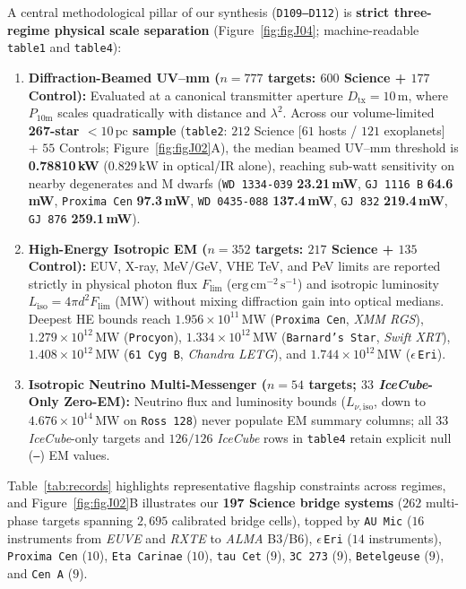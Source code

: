 \documentclass[twocolumn,10pt]{article}
\begin{document}
A central methodological pillar of our synthesis (\texttt{D109--D112}) is \textbf{strict three-regime physical scale separation} (Figure~\ref{fig:figJ04}; machine-readable \texttt{table1} and \texttt{table4}):
\begin{enumerate}
  \item \textbf{Diffraction-Beamed UV--mm ($n=777$ targets: $600$ Science + $177$ Control):} Evaluated at a canonical transmitter aperture $D_{\mathrm{tx}}=10\,\mathrm{m}$, where $P_{10\mathrm{m}}$ scales quadratically with distance and $\lambda^2$. Across our volume-limited \textbf{267-star $<10\,\mathrm{pc}$ sample} (\texttt{table2}: $212$ Science [$61$ hosts / $121$ exoplanets] + $55$ Controls; Figure~\ref{fig:figJ02}A), the median beamed UV--mm threshold is \textbf{0.78810\,kW} ($0.829\,\mathrm{kW}$ in optical/IR alone), reaching sub-watt sensitivity on nearby degenerates and M dwarfs (\texttt{WD\,1334-039} \textbf{23.21\,mW}, \texttt{GJ\,1116\,B} \textbf{64.6\,mW}, \texttt{Proxima Cen} \textbf{97.3\,mW}, \texttt{WD\,0435-088} \textbf{137.4\,mW}, \texttt{GJ\,832} \textbf{219.4\,mW}, \texttt{GJ\,876} \textbf{259.1\,mW}).
  \item \textbf{High-Energy Isotropic EM ($n=352$ targets: $217$ Science + $135$ Control):} EUV, X-ray, MeV/GeV, VHE TeV, and PeV limits are reported strictly in physical photon flux $F_{\mathrm{lim}}$ ($\mathrm{erg\,cm^{-2}\,s^{-1}}$) and isotropic luminosity $L_{\mathrm{iso}} = 4\pi d^2 F_{\mathrm{lim}}$ ($\mathrm{MW}$) without mixing diffraction gain into optical medians. Deepest HE bounds reach $1.956\times 10^{11}\,\mathrm{MW}$ (\texttt{Proxima Cen}, \textit{XMM RGS}), $1.279\times 10^{12}\,\mathrm{MW}$ (\texttt{Procyon}), $1.334\times 10^{12}\,\mathrm{MW}$ (\texttt{Barnard's Star}, \textit{Swift XRT}), $1.408\times 10^{12}\,\mathrm{MW}$ (\texttt{61\,Cyg\,B}, \textit{Chandra LETG}), and $1.744\times 10^{12}\,\mathrm{MW}$ ($\epsilon$\,\texttt{Eri}).
  \item \textbf{Isotropic Neutrino Multi-Messenger ($n=54$ targets; $33$ \textit{IceCube}-Only Zero-EM):} Neutrino flux and luminosity bounds ($L_{\nu,\mathrm{iso}}$, down to $4.676\times 10^{14}\,\mathrm{MW}$ on \texttt{Ross\,128}) never populate EM summary columns; all $33$ \textit{IceCube}-only targets and $126/126$ \textit{IceCube} rows in \texttt{table4} retain explicit null (\texttt{---}) EM values.
\end{enumerate}

Table~\ref{tab:records} highlights representative flagship constraints across regimes, and Figure~\ref{fig:figJ02}B illustrates our \textbf{197 Science bridge systems} ($262$ multi-phase targets spanning $2{,}695$ calibrated bridge cells), topped by \texttt{AU\,Mic} ($16$ instruments from \textit{EUVE} and \textit{RXTE} to \textit{ALMA} B3/B6), $\epsilon$\,\texttt{Eri} ($14$ instruments), \texttt{Proxima Cen} ($10$), \texttt{Eta Carinae} ($10$), \texttt{tau Cet} ($9$), \texttt{3C\,273} ($9$), \texttt{Betelgeuse} ($9$), and \texttt{Cen\,A} ($9$).
\end{document}
